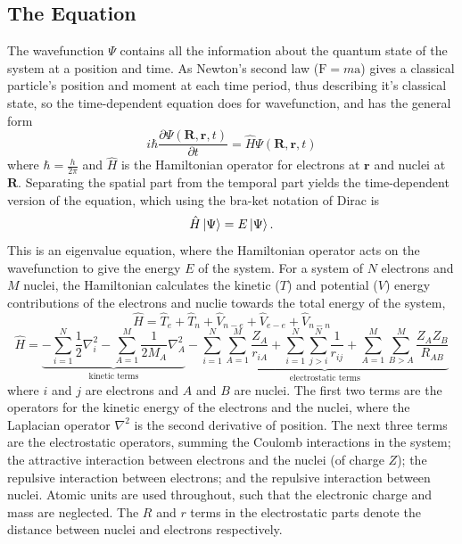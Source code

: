 \subsection{The \schro{} Equation}\label{section: QM_schrodinger}
The wavefunction $\Psi$ contains all the information about the quantum state of the system at a position and time. As Newton's second law ($\bm{\mathrm{F}}=m\bm{\mathrm{a}}$) gives a classical particle's position and moment at each time period, thus describing it's classical state, so the time-dependent \schro{} equation does for wavefunction, and has the general form
\begin{equation}\label{equation: td-schro}
    i\hbar{}\frac{\partial \Psi(\bm{R},\bm{r},t)}{\partial t}=\hat{H}\Psi(\bm{R},\bm{r},t)
\end{equation}
where $\hbar=\frac{h}{2\pi}$ and $\hat{H}$ is the Hamiltonian operator for electrons at $\bm{r}$ and nuclei at $\bm{R}$. Separating the spatial part from the temporal part yields the time-dependent version of the \schro{} equation, which using the bra-ket notation of Dirac is\cite{Schrodinger1926}
\begin{equation}\label{equation: ti-schro}
   \hat{H}\ket{\Psi}=E\ket{\Psi}.
\end{equation}
This is an eigenvalue equation, where the Hamiltonian operator acts on the wavefunction to give the energy $E$ of the system. For a system of $N$ electrons and $M$ nuclei, the Hamiltonian calculates the kinetic ($T$) and potential ($V$) energy contributions of the electrons and nuclie towards the total energy of the system,
\begin{equation}\label{equation: H-simple}
\hat{H}=\hat{T}_{e}+\hat{T}_{n}+\hat{V}_{n-e}+\hat{V}_{e-e}+\hat{V}_{n-n}
\end{equation}
\begin{equation}\label{equation: H}
   \hat{H}=\underbrace{-\sum_{i=1}^{N}\frac{1}{2}\nabla_{i}^2 - \sum_{A=1}^{M}\frac{1}{2M_{A}}\nabla_{A}^2}_\text{kinetic terms}-\underbrace{\sum_{i=1}^{N}\sum_{A=1}^{M}\frac{Z_{A}}{r_{iA}}+\sum_{i=1}^{N}\sum_{j>{i}}^{N}\frac{1}{r_{ij}}+\sum_{A=1}^{M}\sum_{B>{A}}^{M}\frac{Z_{A}Z_{B}}{R_{AB}}}_\text{electrostatic terms}
\end{equation}
where $i$ and $j$ are electrons and $A$ and $B$ are nuclei. The first two terms are the operators for the kinetic energy of the electrons and the nuclei, where the Laplacian operator $\nabla^{2}$ is the second derivative of position. The next three terms are the electrostatic operators, summing the Coulomb interactions in the system;  the attractive interaction between electrons and the nuclei (of charge $Z$); the repulsive interaction between electrons; and the repulsive interaction between nuclei. Atomic units are used throughout, such that the electronic charge and mass are neglected. The $R$ and $r$ terms in the electrostatic parts denote the distance between nuclei and electrons respectively.


